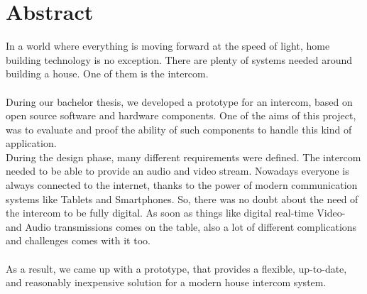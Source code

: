 \section*{Abstract}
\label{sec:abstract}

In a world where everything is moving forward at the speed of light, home building technology is no exception. There are plenty of systems needed around building a house. One of them is the intercom.   
\\
\\
During our bachelor thesis, we developed a prototype for an intercom, based on open source software and hardware components. One of the aims of this project, was to evaluate and proof the ability of such components to handle this kind of application.
\\
During the design phase, many different requirements were defined. The intercom needed to be able to provide an audio and video stream. Nowadays everyone is always connected to the internet, thanks to the power of modern communication systems like Tablets and Smartphones. So, there was no doubt about the need of the intercom to be fully digital. As soon as things like digital real-time Video- and Audio transmissions comes on the table, also a lot of different complications and challenges comes with it too.
\\
\\
As a result, we came up with a prototype, that provides a flexible, up-to-date, and reasonably inexpensive solution for a modern house intercom system.
